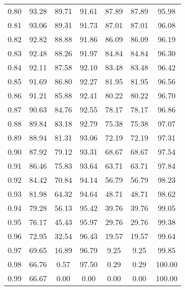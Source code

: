 \begin{tabular}{|c|c|c|c|c|c|c|}
      0.80 &     93.28 &     89.71 &      91.61 &   87.89 &      87.89 &         95.98 \\
      0.81 &     93.06 &     89.31 &      91.73 &   87.01 &      87.01 &         96.08 \\
      0.82 &     92.82 &     88.88 &      91.86 &   86.09 &      86.09 &         96.19 \\
      0.83 &     92.48 &     88.26 &      91.97 &   84.84 &      84.84 &         96.30 \\
      0.84 &     92.11 &     87.58 &      92.10 &   83.48 &      83.48 &         96.42 \\
      0.85 &     91.69 &     86.80 &      92.27 &   81.95 &      81.95 &         96.56 \\
      0.86 &     91.21 &     85.88 &      92.41 &   80.22 &      80.22 &         96.70 \\
      0.87 &     90.63 &     84.76 &      92.55 &   78.17 &      78.17 &         96.86 \\
      0.88 &     89.84 &     83.18 &      92.79 &   75.38 &      75.38 &         97.07 \\
      0.89 &     88.94 &     81.31 &      93.06 &   72.19 &      72.19 &         97.31 \\
      0.90 &     87.92 &     79.12 &      93.31 &   68.67 &      68.67 &         97.54 \\
      0.91 &     86.46 &     75.83 &      93.64 &   63.71 &      63.71 &         97.84 \\
      0.92 &     84.42 &     70.84 &      94.14 &   56.79 &      56.79 &         98.23 \\
      0.93 &     81.98 &     64.32 &      94.64 &   48.71 &      48.71 &         98.62 \\
      0.94 &     79.28 &     56.13 &      95.42 &   39.76 &      39.76 &         99.05 \\
      0.95 &     76.17 &     45.43 &      95.97 &   29.76 &      29.76 &         99.38 \\
      0.96 &     72.95 &     32.54 &      96.43 &   19.57 &      19.57 &         99.64 \\
      0.97 &     69.65 &     16.89 &      96.79 &    9.25 &       9.25 &         99.85 \\
      0.98 &     66.76 &      0.57 &      97.50 &    0.29 &       0.29 &        100.00 \\
      0.99 &     66.67 &      0.00 &       0.00 &    0.00 &       0.00 &        100.00 \\
\bottomrule
\end{tabular}
